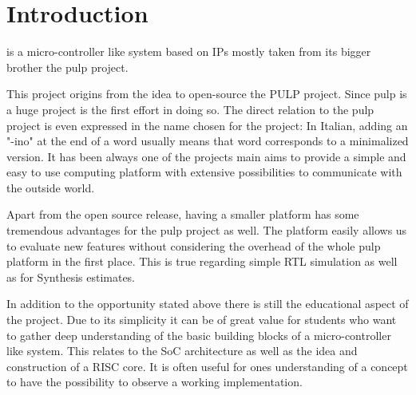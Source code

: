 
\chapter{Introduction}
\pulpino is a micro-controller like system based on IPs mostly taken from its bigger brother the \gls{pulp} project.

This project origins from the idea to open-source the PULP project. Since \gls{pulp} is a huge project \pulpino is
the first effort in doing so. The direct relation to the \gls{pulp} project is even expressed in the name chosen for
the project: In Italian, adding an "-ino" at the end of a word usually means that word corresponds to a minimalized version.
It has been always one of the projects main aims to provide a simple and easy to use computing platform with extensive possibilities
to communicate with the outside world.

Apart from the open source release, having a smaller platform has some tremendous advantages for the \gls{pulp} project as
well. The \pulpino platform easily allows us to evaluate new features without considering the overhead of the whole \gls{pulp}
platform in the first place. This is true regarding simple RTL simulation as well as for Synthesis estimates.

In addition to the opportunity stated above there is still the educational aspect of the project. Due to its simplicity
it can be of great value for students who want to gather deep understanding of the basic building blocks of a
micro-controller like system. This relates to the SoC architecture as well as the idea and construction of a RISC core.
It is often useful for ones understanding of a concept to have the possibility to observe a working implementation.

